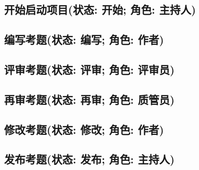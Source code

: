 \documentclass[hyperref, a4paper]{ctexart}
\begin{document}
\hypertarget{ux5f00ux59cbux542fux52a8ux9879ux76eeux72b6ux6001-ux5f00ux59cb-ux89d2ux8272-ux4e3bux6301ux4eba}{%
\subsection{开始启动项目(状态: 开始; 角色:
主持人)}\label{ux5f00ux59cbux542fux52a8ux9879ux76eeux72b6ux6001-ux5f00ux59cb-ux89d2ux8272-ux4e3bux6301ux4eba}}

\hypertarget{ux7f16ux5199ux8003ux9898ux72b6ux6001-ux7f16ux5199-ux89d2ux8272-ux4f5cux8005}{%
\subsection{编写考题(状态: 编写; 角色:
作者)}\label{ux7f16ux5199ux8003ux9898ux72b6ux6001-ux7f16ux5199-ux89d2ux8272-ux4f5cux8005}}

\hypertarget{ux8bc4ux5ba1ux8003ux9898ux72b6ux6001-ux8bc4ux5ba1-ux89d2ux8272-ux8bc4ux5ba1ux5458}{%
\subsection{评审考题(状态: 评审; 角色:
评审员)}\label{ux8bc4ux5ba1ux8003ux9898ux72b6ux6001-ux8bc4ux5ba1-ux89d2ux8272-ux8bc4ux5ba1ux5458}}

\hypertarget{ux518dux5ba1ux8003ux9898ux72b6ux6001-ux518dux5ba1-ux89d2ux8272-ux8d28ux7ba1ux5458}{%
\subsection{再审考题(状态: 再审; 角色:
质管员)}\label{ux518dux5ba1ux8003ux9898ux72b6ux6001-ux518dux5ba1-ux89d2ux8272-ux8d28ux7ba1ux5458}}

\hypertarget{ux4feeux6539ux8003ux9898ux72b6ux6001-ux4feeux6539-ux89d2ux8272-ux4f5cux8005}{%
\subsection{修改考题(状态: 修改; 角色:
作者)}\label{ux4feeux6539ux8003ux9898ux72b6ux6001-ux4feeux6539-ux89d2ux8272-ux4f5cux8005}}

\hypertarget{ux53d1ux5e03ux8003ux9898ux72b6ux6001-ux53d1ux5e03-ux89d2ux8272-ux4e3bux6301ux4eba}{%
\subsection{发布考题(状态: 发布; 角色:
主持人)}\label{ux53d1ux5e03ux8003ux9898ux72b6ux6001-ux53d1ux5e03-ux89d2ux8272-ux4e3bux6301ux4eba}}
\end{document}
